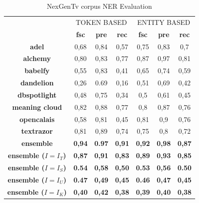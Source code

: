 \documentclass{llncs}
\begin{document}
\begin{table}[p]
      \centering
      \setlength{\tabcolsep}{12pt}
      \begin{tabular}{c|c|c|c|c|c|c|}
      \multicolumn{1}{c}{ } &
      \multicolumn{3}{|c|}{TOKEN BASED} & 
      \multicolumn{3}{|c|}{ENTITY BASED} \\
      & \textbf{fsc} &\textbf{pre} & \textbf{rec} 
      & \textbf{fsc} &\textbf{pre} & \textbf{rec} 
      \\ \hline
      \textbf{adel}           & 0,68  & 0,84  & 0,57 & 0,75  & 0,83  & 0,7  \\ \hline
      \textbf{alchemy}        & 0,80  & 0,83  & 0,77 & 0,87  & 0,97  & 0,81 \\ \hline
      \textbf{babelfy}        & 0,55  & 0,83  & 0,41 & 0,65  & 0,74  & 0,59 \\ \hline
      \textbf{dandelion}      & 0,26  & 0.69  & 0,16 & 0,51  & 0,69  & 0,42 \\ \hline
      \textbf{dbspotlight}    & 0,48  & 0,75  & 0,34 & 0,5   & 0,61  & 0,45 \\ \hline
      \textbf{meaning cloud}  & 0,82  & 0,88  & 0,77 & 0,8   & 0,87  & 0,76 \\ \hline
      \textbf{opencalais}     & 0,58  & 0,81  & 0,45 & 0,81  & 0,9   & 0,76 \\ \hline
      \textbf{textrazor}      & 0,81  & 0,89  & 0,74 & 0,75  & 0,8   & 0,72 \\ \hline \hline
      \textbf{ensemble}       & \textbf{0,94}  & \textbf{0.97}  & \textbf{0,91}  & \textbf{0,92} & \textbf{0,98}  & \textbf{0,87} \\ \hline
      \textbf{ensemble ($I=I_T$)}        & \textbf{0,87}   & \textbf{0,91}   & \textbf{0,83}  & \textbf{0,89} & \textbf{0,93}  & \textbf{0,85} \\ \hline
       \textbf{ensemble ($I=I_S$)}        & \textbf{0.54}   & \textbf{0,58}   & \textbf{0,50}  & \textbf{0.53} & \textbf{0,56}  & \textbf{0.50} \\\hline    
       \textbf{ensemble ($I=I_U$)}        & \textbf{0.47}   & \textbf{0,49}   & \textbf{0,45}  & \textbf{0.46} & \textbf{0,47}  & \textbf{0,45} \\\hline
       \textbf{ensemble ($I=I_K$)}        & \textbf{0,40}   & \textbf{0,42}   & \textbf{0,38}  & \textbf{0,39} & \textbf{0,40}  & \textbf{0,38} \\\hline    
      \end{tabular}
    \caption{NexGenTv corpus NER Evaluation}
    \label{typescoresNEXGENTV}

\end{table}
\end{document}
